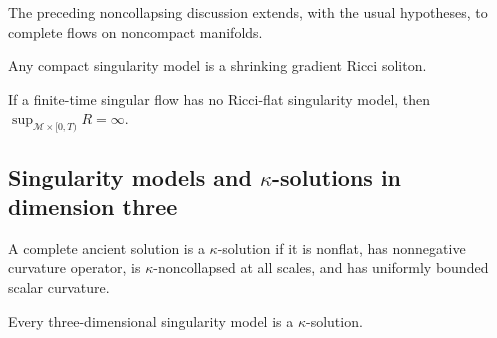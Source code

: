 \begin{remark}
\label{rem:chow-iv-noncompact-extension}
The preceding noncollapsing discussion extends, with the usual hypotheses,
to complete flows on noncompact manifolds.
\end{remark}

\begin{theorem}
\label{thm:chow-iv-compact-singularity-models}
Any compact singularity model is a shrinking gradient Ricci soliton.
\end{theorem}

\begin{lemma}
\label{lem:chow-iv-bounded-scalar-criterion}
If a finite-time singular flow has no Ricci-flat singularity model, then
\(\sup_{\mathcal M\times[0,T)}R=\infty\).
\end{lemma}

\subsection{\texorpdfstring{Singularity models and \(\kappa\)-solutions in dimension three}{Singularity models and Kappa-solutions in dimension three}}

\begin{definition}
\label{def:chow-iv-kappa-solution}
A complete ancient solution is a \(\kappa\)-solution if it is nonflat, has
nonnegative curvature operator, is \(\kappa\)-noncollapsed at all scales, and
has uniformly bounded scalar curvature.
\end{definition}

\begin{theorem}
\label{thm:chow-iv-3d-models-kappa}
Every three-dimensional singularity model is a \(\kappa\)-solution.
\end{theorem}


